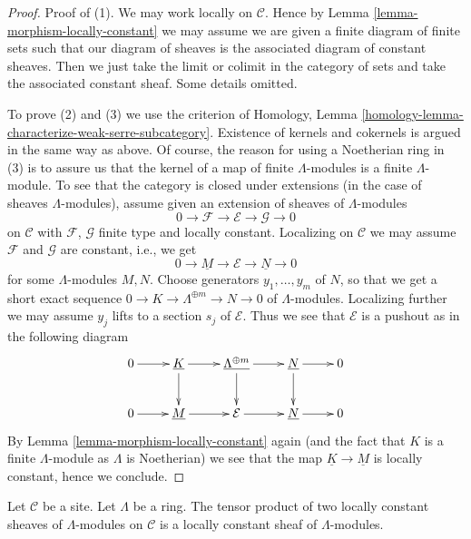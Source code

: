 \begin{proof}
Proof of (1). We may work locally on $\mathcal{C}$. Hence by
Lemma \ref{lemma-morphism-locally-constant} we may assume
we are given a finite diagram of
finite sets such that our diagram of sheaves is the associated
diagram of constant sheaves. Then we just take the limit or colimit
in the category of sets and take the associated constant sheaf.
Some details omitted.

\medskip\noindent
To prove (2) and (3) we use the criterion of
Homology, Lemma \ref{homology-lemma-characterize-weak-serre-subcategory}.
Existence of kernels and cokernels is argued in the same way
as above. Of course, the reason for using
a Noetherian ring in (3) is to assure us that the kernel of a map
of finite $\Lambda$-modules is a finite $\Lambda$-module.
To see that the category is closed under extensions
(in the case of sheaves $\Lambda$-modules), assume given
an extension of sheaves of $\Lambda$-modules
$$
0 \to \mathcal{F} \to \mathcal{E} \to \mathcal{G} \to 0
$$
on $\mathcal{C}$ with $\mathcal{F}$, $\mathcal{G}$
finite type and locally constant. Localizing on $\mathcal{C}$
we may assume $\mathcal{F}$ and $\mathcal{G}$ are constant, i.e., we
get
$$
0 \to \underline{M} \to \mathcal{E} \to \underline{N} \to 0
$$
for some $\Lambda$-modules $M, N$. Choose generators $y_1, \ldots, y_m$
of $N$, so that we get a short exact sequence
$0 \to K \to \Lambda^{\oplus m} \to N \to 0$ of $\Lambda$-modules.
Localizing further we may assume $y_j$ lifts to a section
$s_j$ of $\mathcal{E}$. Thus we see that $\mathcal{E}$ is a
pushout as in the following diagram
$$
\xymatrix{
0 \ar[r] &
\underline{K} \ar[d] \ar[r] &
\underline{\Lambda^{\oplus m}} \ar[d] \ar[r] &
\underline{N} \ar[d] \ar[r] & 0 \\
0 \ar[r] &
\underline{M} \ar[r] &
\mathcal{E} \ar[r] &
\underline{N} \ar[r] & 0
}
$$
By Lemma \ref{lemma-morphism-locally-constant} again (and the fact that
$K$ is a finite $\Lambda$-module as $\Lambda$ is Noetherian) we see that
the map $\underline{K} \to \underline{M}$ is locally constant, hence
we conclude.
\end{proof}

\begin{lemma}
\label{lemma-tensor-product-locally-constant}
Let $\mathcal{C}$ be a site. Let $\Lambda$ be a ring.
The tensor product of two locally constant sheaves of $\Lambda$-modules
on $\mathcal{C}$ is a locally constant sheaf of $\Lambda$-modules.
\end{lemma}

